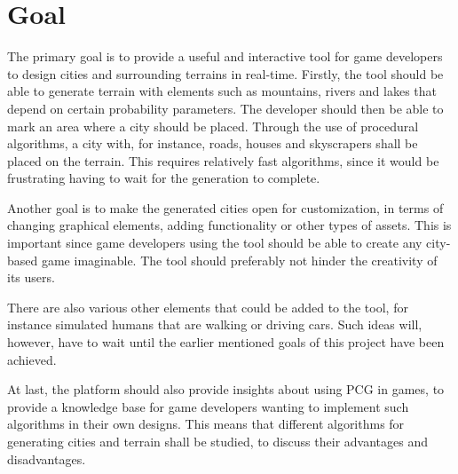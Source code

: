 \section{Goal}
The primary goal is to provide a useful and interactive tool for game developers to design cities and surrounding terrains in real-time. Firstly, the tool should be able to generate terrain with elements such as mountains, rivers and lakes that depend on certain probability parameters. The developer should then be able to mark an area where a city should be placed. Through the use of procedural algorithms, a city with, for instance, roads, houses and skyscrapers shall be placed on the terrain. This requires relatively fast algorithms, since it would be frustrating having to wait for the generation to complete.

Another goal is to make the generated cities open for customization, in terms of changing graphical elements, adding functionality or other types of assets. This is important since game developers using the tool should be able to create any city-based game imaginable. The tool should preferably not hinder the creativity of its users.

There are also various other elements that could be added to the tool, for instance simulated humans that are walking or driving cars. Such ideas will, however, have to wait until the earlier mentioned goals of this project have been achieved.

At last, the platform should also provide insights about using PCG in games, to provide a knowledge base for game developers wanting to implement such algorithms in their own designs. This means that different algorithms for generating cities and terrain shall be studied, to discuss their advantages and disadvantages.